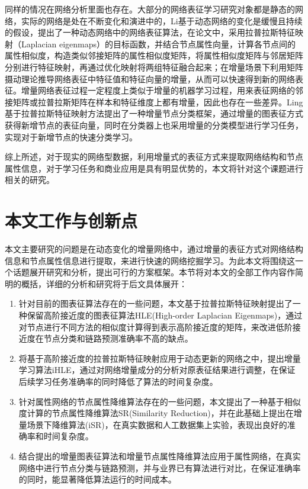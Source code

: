 同样的情况在网络分析里面也存在。大部分的网络表征学习研究对象都是静态的网络，实际的网络是处在不断变化和演进中的，Li\cite{li2017attributed}基于动态网络的变化是缓慢且持续的假设，提出了一种动态网络中的网络表征算法，在论文中，采用拉普拉斯特征映射（Laplacian eigenmaps）的目标函数，并结合节点属性向量，计算各节点间的属性相似度，构造类似邻接矩阵的属性相似度矩阵，将属性相似度矩阵与邻居矩阵分别进行特征映射，再通过优化映射将两组特征融合起来；在增量场景下利用矩阵摄动理论推导网络表征中特征值和特征向量的增量，从而可以快速得到新的网络表征。增量网络表征过程一定程度上类似于增量的机器学习过程，用来表征网络的邻接矩阵或拉普拉斯矩阵在样本和特征维度上都有增量，因此也存在一些差异。Ling\cite{jian2018toward}基于拉普拉斯特征映射方法提出了一种增量节点分类框架，通过增量的图表征方式获得新增节点的表征向量，同时在分类器上也采用增量的分类模型进行学习任务，实现对于新增节点的快速分类学习。

综上所述，对于现实的网络型数据，利用增量式的表征方式来提取网络结构和节点属性信息，对于学习任务和商业应用是具有明显优势的，本文将针对这个课题进行相关的研究。




\section{本文工作与创新点}
本文主要研究的问题是在动态变化的增量网络中，通过增量的表征方式对网络结构信息和节点属性信息进行提取，来进行快速的网络挖掘学习。为此本文将围绕这一个话题展开研究和分析，提出可行的方案框架。本节将对本文的全部工作内容作简明的概括，详细的分析和研究将于后文具体展开：


\begin{enumerate}
	\item 针对目前的图表征算法存在的一些问题，本文基于拉普拉斯特征映射提出了一种保留高阶接近度的图表征算法HLE(High-order Laplacian Eigenmaps)，通过对节点进行不同方法的相似度计算得到表示高阶接近度的矩阵，来改进低阶接近度在节点分类和链路预测准确率不高的缺点。
	\item 将基于高阶接近度的拉普拉斯特征映射应用于动态更新的网络之中，提出增量学习算法iHLE，通过对网络增量成分的分析对原表征结果进行调整，在保证后续学习任务准确率的同时降低了算法的时间复杂度。
	\item 针对属性网络的节点属性降维算法存在的一些问题，本文提出了一种基于相似度计算的节点属性降维算法SR(Similarity Reduction)，并在此基础上提出在增量场景下降维算法(iSR)，在真实数据和人工数据集上实验，表现出良好的准确率和时间复杂度。
	\item 结合提出的增量图表征算法和增量节点属性降维算法应用于属性网络，在真实网络中进行节点分类与链路预测，并与业界已有算法进行对比，在保证准确率的同时，能显著降低算法运行的时间成本。
\end{enumerate}






